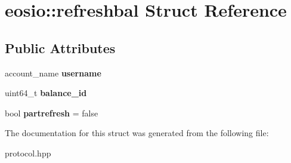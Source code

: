 \hypertarget{structeosio_1_1refreshbal}{}\section{eosio\+:\+:refreshbal Struct Reference}
\label{structeosio_1_1refreshbal}
\subsection*{Public Attributes}
\begin{DoxyCompactItemize}
\item 
\mbox{\label{structeosio_1_1refreshbal_a147e6b2d65705730f3b9dfeb14f4114e}} 
account\+\_\+name {\bfseries username}
\item 
\mbox{\label{structeosio_1_1refreshbal_af4e3155a9a9decd81afbc3e114f4a3a8}} 
uint64\+\_\+t {\bfseries balance\+\_\+id}
\item 
\mbox{\label{structeosio_1_1refreshbal_abdf5994c82b338338b9a5519725ab73a}} 
bool {\bfseries partrefresh} = false
\end{DoxyCompactItemize}


The documentation for this struct was generated from the following file\+:\begin{DoxyCompactItemize}
\item 
protocol.\+hpp\end{DoxyCompactItemize}
